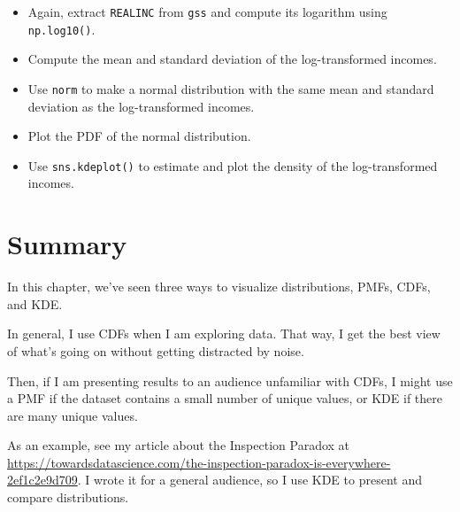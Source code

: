 \begin{itemize}
\item
  Again, extract \passthrough{\lstinline!REALINC!} from
  \passthrough{\lstinline!gss!} and compute its logarithm using
  \passthrough{\lstinline!np.log10()!}.
\item
  Compute the mean and standard deviation of the log-transformed
  incomes.
\item
  Use \passthrough{\lstinline!norm!} to make a normal distribution with
  the same mean and standard deviation as the log-transformed incomes.
\item
  Plot the PDF of the normal distribution.
\item
  Use \passthrough{\lstinline!sns.kdeplot()!} to estimate and plot the
  density of the log-transformed incomes.
\end{itemize}

\hypertarget{summary}{%
\section{Summary}\label{summary}}

In this chapter, we've seen three ways to visualize distributions, PMFs,
CDFs, and KDE.

In general, I use CDFs when I am exploring data. That way, I get the
best view of what's going on without getting distracted by noise.

Then, if I am presenting results to an audience unfamiliar with CDFs, I
might use a PMF if the dataset contains a small number of unique values,
or KDE if there are many unique values.

As an example, see my article about the Inspection Paradox at
\url{https://towardsdatascience.com/the-inspection-paradox-is-everywhere-2ef1c2e9d709}.
I wrote it for a general audience, so I use KDE to present and compare
distributions.

